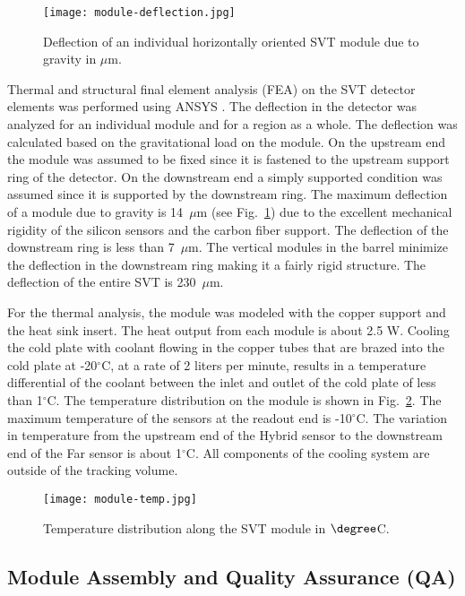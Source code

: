 \begin{figure}[hbt] 
\centering 
\texttt{[image: module-deflection.jpg]}
\caption{Deflection of an individual horizontally oriented SVT module due to gravity in $\mu$m.}
\label{fig:module-deflection}
\end{figure}

Thermal and structural final element analysis (FEA) on the SVT detector elements was performed using ANSYS \cite{ANSYS}. The deflection in the detector was analyzed for an individual module and for a region as a whole. The deflection was calculated based on the gravitational load on the module. On the upstream end the module was assumed to be fixed since it is fastened to the upstream support ring of the detector. On the downstream end a simply supported condition was assumed since it is supported by the downstream ring. The maximum deflection of a module due to gravity is 14~$\mu$m (see Fig.~\ref{fig:module-deflection}) due to the excellent mechanical rigidity of the silicon sensors and the carbon fiber support. The deflection of the downstream ring is less than 7~$\mu$m. The vertical modules in the barrel minimize the deflection in the downstream ring making it a fairly rigid structure. The deflection of the entire SVT is 230~$\mu$m. 

For the thermal analysis, the module was modeled with the copper support and the heat sink insert. The heat output from each module is about 2.5 W. Cooling the cold plate with coolant flowing in the copper tubes that are brazed into the cold plate at -20$^\circ$C, at a rate of 2 liters per minute, results in a temperature differential of the coolant between the inlet and outlet of the cold plate of less than 1$^\circ$C. The temperature distribution on the module is shown in Fig.~\ref{fig:module-temp}. The maximum temperature of the sensors at the readout end is -10$^\circ$C. The variation in temperature from the upstream end of the Hybrid sensor to the downstream end of the Far sensor is about 1$^\circ$C. All components of the cooling system are outside of the tracking volume.

\begin{figure}[hbt] 
\centering 
\texttt{[image: module-temp.jpg]}
\caption{Temperature distribution along the SVT module in $\degree$C.}
\label{fig:module-temp}
\end{figure}

\subsection{Module Assembly and Quality Assurance (QA)}

